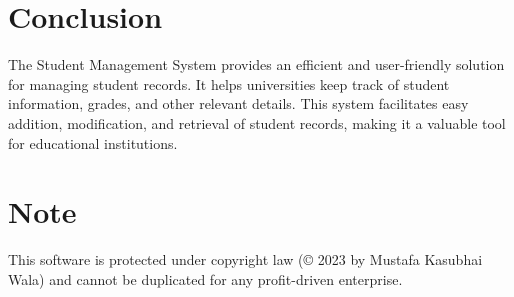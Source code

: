 \documentclass[a4paper,12pt]{article}
\begin{document}
\section*{Conclusion}
The Student Management System provides an efficient and user-friendly solution for managing student records. It helps universities keep track of student information, grades, and other relevant details. This system facilitates easy addition, modification, and retrieval of student records, making it a valuable tool for educational institutions.

\section*{Note}
This software is protected under copyright law (© 2023 by Mustafa Kasubhai Wala) and cannot be duplicated for any profit-driven enterprise.
\end{document}
